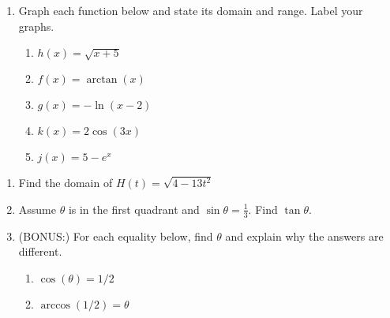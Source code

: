 \documentclass[11pt,fleqn]{article}
\begin{document}
\begin{enumerate}
\item Graph each function below and state its domain and range. Label your graphs.
	\begin{enumerate}
	\item $h(x)=\sqrt{x+5}$
	\vfill
	\item  $f(x)=\arctan(x)$
	\vfill
	\item  $g(x)=-\ln (x-2)$
	\vfill
	\item  $k(x)=2\cos(3x)$
	\vfill
	\item  $j(x)=5-e^x$
	\vfill
	\end{enumerate}
\newpage

\end{enumerate}

\begin{enumerate}
\item Find the domain of $H(t)=\sqrt{4-13t^2}$
\vfill
\item Assume $\theta$ is in the first quadrant and $\sin \theta = \frac{1}{3}.$ Find $\tan \theta.$
\vfill

  
\item (BONUS:)  For each equality below, find $\theta$ and explain why the answers are different.\\
\begin{multicols}{2}
\begin{enumerate}
\item $\cos (\theta) =1/2$
\item $\arccos(1/2)=\theta$
\end{enumerate} 
\end{multicols}
\vfill
\end{enumerate}
\end{document}
